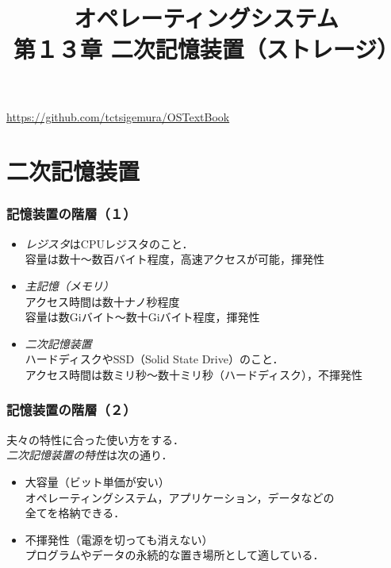 \documentclass[unicode,handout]{beamer}                   %
\begin{document}
\title[二次記憶装置]
      {オペレーティングシステム\\第１３章 二次記憶装置（ストレージ）}
\date{}
\begin{frame}
  \titlepage
  \centerline{\url{https://github.com/tctsigemura/OSTextBook}}
\end{frame}


\section{二次記憶装置}
\begin{frame}
  \frametitle{記憶装置の階層（１）}
  \begin{itemize}
  \item \emph{レジスタ}はCPUレジスタのこと．\\
    容量は数十〜数百バイト程度，高速アクセスが可能，揮発性
  \item \emph{主記憶（メモリ）} \\
    アクセス時間は数十ナノ秒程度\\
    容量は数Giバイト〜数十Giバイト程度，揮発性
  \item \emph{二次記憶装置} \\
    ハードディスクやSSD（Solid State Drive）のこと．\\
    アクセス時間は数ミリ秒〜数十ミリ秒（ハードディスク），不揮発性
\end{itemize}
\end{frame}

\begin{frame}
  \frametitle{記憶装置の階層（２）}
  夫々の特性に合った使い方をする．\\
  \emph{二次記憶装置の特性}は次の通り．
  \begin{itemize}
  \item 大容量（ビット単価が安い）\\
    オペレーティングシステム，アプリケーション，データなどの\\
    全てを格納できる．
  \item 不揮発性（電源を切っても消えない） \\
    プログラムやデータの永続的な置き場所として適している．
  \end{itemize}
  \vfill
\end{frame}
\end{document}
